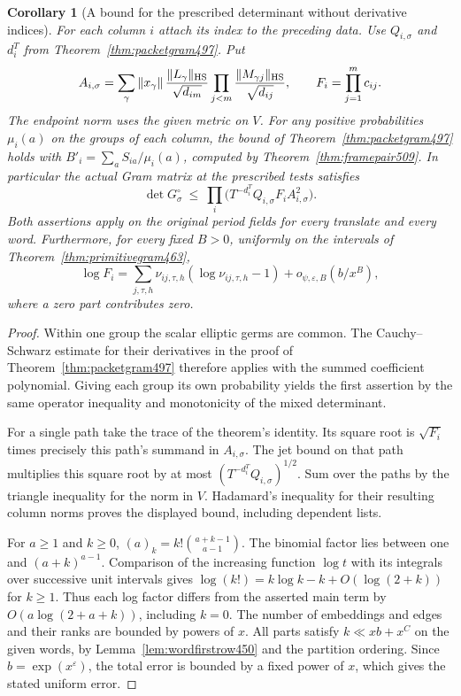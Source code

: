 \documentclass[a4paper,11pt]{article}
\newtheorem{corollary}[proposition]{Corollary}
\theoremstyle{definition}
\theoremstyle{remark}
\numberwithin{equation}{section}
\begin{document}
\begin{corollary}[A bound for the prescribed determinant without derivative indices]\leavevmode
\label{cor:frameheight509}
For each column \(i\) attach its index to the preceding data.
Use \(Q_{i,\sigma}\) and \(d_i^T\) from
Theorem~\ref{thm:packetgram497}. Put
\[
  A_{i,\sigma}=\sum_\gamma
    \|x_\gamma\|\,
    \frac{\|L_\gamma\|_{\rm HS}}{\sqrt{d_{im}}}
    \prod_{j<m}\frac{\|M_{\gamma j}\|_{\rm HS}}{\sqrt{d_{ij}}},
   \qquad F_i=\prod_{j=1}^m c_{ij}.
\]
The endpoint norm uses the given metric on \(V\). For any
positive probabilities \(\mu_i(a)\) on the groups of each
column, the bound of Theorem~\ref{thm:packetgram497} holds with
\(B'_i=\sum_a S_{ia}/\mu_i(a)\), computed by
Theorem~\ref{thm:framepair509}. In particular the actual Gram
matrix at the prescribed tests satisfies
\[
       \det G^\circ_\sigma
         \ \le\ \prod_i
             \bigl(T^{-d_i^T}Q_{i,\sigma} F_i A_{i,\sigma}^2\bigr).
\]
Both assertions apply on the original period fields for every
translate and every word. Furthermore, for every fixed \(B>0\),
uniformly on the intervals of Theorem~\ref{thm:primitivegram463},
\[
  \log F_i
   =\sum_{j,\tau,h}\nu_{ij,\tau,h}
                  (\log\nu_{ij,\tau,h}-1)
                    +o_{\psi,\varepsilon,B}(b/x^B),
\]
where a zero part contributes zero.
\end{corollary}
\begin{proof}
Within one group the scalar elliptic germs are common. The
Cauchy--Schwarz estimate for their derivatives in the proof of
Theorem~\ref{thm:packetgram497} therefore applies with the
summed coefficient polynomial. Giving each group its own
probability yields the first assertion by the same operator
inequality and monotonicity of the mixed determinant.

For a single path take the trace of the theorem's identity.
Its square root is \(\sqrt{F_i}\) times precisely this path's
summand in \(A_{i,\sigma}\). The jet bound on that path multiplies
this square root by at most \((T^{-d_i^T}Q_{i,\sigma})^{1/2}\).
Sum over the paths by the triangle inequality for the norm in
\(V\). Hadamard's inequality for their resulting column norms
proves the displayed bound, including dependent lists.

For \(a\ge1\) and \(k\ge0\),
\((a)_k=k!\binom{a+k-1}{a-1}\). The binomial factor lies
between one and \((a+k)^{a-1}\). Comparison of the increasing
function \(\log t\) with its integrals over successive unit
intervals gives \(\log(k!)=k\log k-k+O(\log(2+k))\) for \(k\ge1\).
Thus each log factor differs from the asserted main term by
\(O(a\log(2+a+k))\), including \(k=0\). The number of
embeddings and edges and their ranks are bounded by powers of
\(x\). All parts satisfy \(k\ll xb+x^C\) on the given words,
by Lemma~\ref{lem:wordfirstrow450} and the partition ordering.
Since \(b=\exp(x^\varepsilon)\), the total error is bounded
by a fixed power of \(x\), which gives the stated uniform error.
\end{proof}
\end{document}
